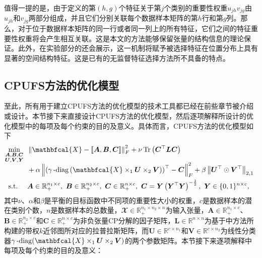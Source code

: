 值得一提的是，由于定义的第$(h,g)$个特征关于第$j$个类别的重要性权重$u_{jh}v_{jg}$由$u_{jh}$和$v_{jg}$两部分组成，并且它们分别关联每个数据样本矩阵的第$h$行和第$g$列。那么，对于位于数据样本矩阵的同一行或者同一列上的所有特征，它们之间的特征重要性权重将会产生相互关联。这是本文的方法能够保留张量的结构信息的理论保证。此外，在实验部分的还会展示，这一机制将赋予被选择特征在位置分布上具有显著的空间结构特征。这是已有的无监督特征选择方法所不具备的特点。


\subsection{CPUFS方法的优化模型}\label{sec:opt-model-CPUFS}
至此，所有用于建立CPUFS方法的优化模型的技术工具都已经在前些章节被介绍或设计。本节接下来直接设计CPUFS方法的优化模型，然后逐项解释所设计的优化模型中的每项及每个约束的目的及意义。具体而言，CPUFS方法的优化模型如下
\begin{gather}\label{eq:tensor-based-ufs}
\begin{aligned}
& \underset{\smash[b]{\substack{\mathclap{\boldsymbol{A},\boldsymbol{B},\boldsymbol{C}}\\\mathclap{\boldsymbol{U},\boldsymbol{V},\boldsymbol{Y}}}}}{\min}
& &  \norm{\mathbfcal{X}-\left\llbracket \boldsymbol{A}, \boldsymbol{B}, \boldsymbol{C} \right\rrbracket}_{F}^{2} + \nu\operatorname{Tr}\left(\boldsymbol{C}^{\top}\boldsymbol{L}\boldsymbol{C}\right) \\ \span&& + \alpha\norm{\left(\mydiag\left(\mathbfcal{X}\times_{1}\boldsymbol{U}\times_{2}\boldsymbol{V}\right)\right)^{\top} - \boldsymbol{C}}_{F}^{2} + \beta \norm{\boldsymbol{U}^{\top}\odot\boldsymbol{V}^{\top}}_{2,1}\\
& \text{s.t.}
& & \boldsymbol{A}\in \mathbb{R}_{+}^{n_1 \times c},~\boldsymbol{B}\in \mathbb{R}_{+}^{n_2 \times c},~\boldsymbol{C}\in \mathbb{R}_{+}^{n \times c},~\boldsymbol{C}=\boldsymbol{Y}\left(\boldsymbol{Y}^{\top} \boldsymbol{Y}\right)^{-\frac{1}{2}},~\boldsymbol{Y}\in\{0,1\}^{n\times c},
\end{aligned}
\raisetag{2.33\normalbaselineskip}
\end{gather}
其中$\nu$、$\alpha$和$\beta$是平衡的目标函数中不同项的重要性大小的权重，$c$是数据样本的潜在类别个数，$n$是数据样本的总数量，$\mathbfcal{X}\in\mathbb{R}_{+}^{n_{1}\times n_{2}\times n}$为输入张量，$\boldsymbol{A} \in \mathbb{R}_{+}^{n_{1}\times c}$、$\boldsymbol{B} \in \mathbb{R}_{+}^{n_{2}\times c}$和$\boldsymbol{C} \in \mathbb{R}_{+}^{n\times c}$为非负张量CP分解的因子矩阵，$\boldsymbol{L} \in \mathbb{R}^{n\times n}$为基于中方法所构建的带权$k$近邻图所对应的拉普拉斯矩阵，而$\boldsymbol{U}\in\mathbb{R}^{c\times n_{1}}$和$\boldsymbol{V}\in\mathbb{R}^{c\times n_{2}}$为线性分类器$\mydiag(\mathbfcal{X}\times_{1}\boldsymbol{U}\times_{2}\boldsymbol{V})$的两个参数矩阵。本节接下来逐项解释中每项及每个约束的目的及意义：

